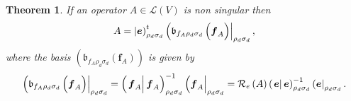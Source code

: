 \documentclass[aps,preprint]{revtex4}
\newtheorem{theorem}{Theorem}
\begin{document}
\begin{theorem}
If an operator $A\in \mathcal{L}\left( V\right) $ is non singular then 
\begin{equation}
A=\left\vert \overset{}{\boldsymbol{e}}\right) _{\rho _{d}\sigma
_{d}}^{t}\left( \mathfrak{b}_{f_{A}\rho _{d}\sigma _{d}}\left( \overset{}{%
\boldsymbol{f}_{A}}\right) \right\vert _{\rho _{d}\sigma _{d}},
\end{equation}%
where the basis $\left( \mathfrak{b}_{f_{A}\rho _{d}\sigma _{d}}\left( 
\boldsymbol{f}_{A}\right) \right) $ is given by 
\begin{equation}
\left( \mathfrak{b}_{f_{A}\rho _{d}\sigma _{d}}\left( \overset{}{\boldsymbol{%
f}_{A}}\right) \right\vert _{\rho _{d}\sigma _{d}}=\left( \left. \overset{}{%
\boldsymbol{f}_{A}}\right\vert \boldsymbol{f}_{A}\right) _{\rho _{d}\sigma
_{d}}^{-1}\left( \overset{}{\boldsymbol{f}_{A}}\right\vert _{\rho _{d}\sigma
_{d}}=\mathcal{R}_{e}\left( A\right) \left( \left. \overset{}{\boldsymbol{e}}%
\right\vert \boldsymbol{e}\right) _{\rho _{d}\sigma _{d}}^{-1}\left( \overset%
{}{\boldsymbol{e}}\right\vert _{\rho _{d}\sigma _{d}}.
\end{equation}


\end{theorem}
\end{document}
